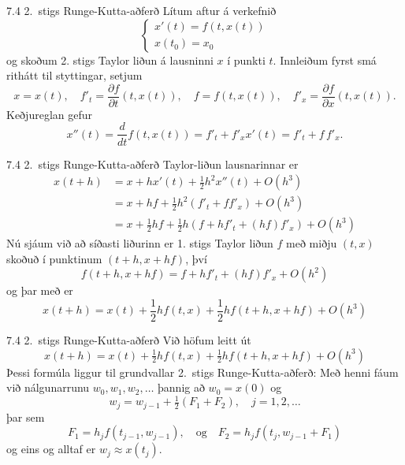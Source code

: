 \begin{frame}{7.4 2.~stigs Runge-Kutta-aðferð} 
Lítum aftur á verkefnið
\begin{equation*}
  \left\{
    \begin{array}{l}
      x'(t) = f(t,x(t)) \\
      x(t_0) = x_0
    \end{array}
  \right.
\end{equation*}
og skoðum 2. stigs Taylor liðun á lausninni $x$ í punkti
$t$. Innleiðum fyrst smá rithátt til styttingar, setjum 
\begin{equation*}
  x = x(t), \quad f'_t = \frac{\partial f}{\partial t}(t,x(t)), \quad
  f = f(t,x(t)), \quad f'_x = \frac{\partial f}{\partial x}(t,x(t)).
\end{equation*}
Keðjureglan gefur
$$
x''(t)=\dfrac d{dt}f(t,x(t))=f'_t+f'_xx'(t)=f'_t+f\,f'_x.
$$
\end{frame}


\begin{frame}{7.4 2.~stigs Runge-Kutta-aðferð} 
Taylor-liðun lausnarinnar er 
\begin{align*}
  x(t+h) &= x + hx'(t) + \frac{1}{2} h^2 x''(t) + O(h^3) \\
  &= x + hf + \frac{1}{2} h^2 ( f'_t + f f'_x ) + O(h^3) \\
  &= x + \frac{1}{2}hf + \frac{1}{2}h( f + hf'_t + (hf)f'_x) + O(h^3)
\end{align*}
Nú sjáum við að síðasti liðurinn er 1. stigs Taylor 
liðun $f$ með miðju $(t,x)$ skoðuð í punktinum $(t+h,x+hf)$, því
\begin{equation*}
  f(t+h,x + hf) = f + hf'_t + (hf) f'_x + O(h^2)
\end{equation*}
og þar með er
\begin{equation*}
  x(t+h) = x(t) + \frac{1}{2} hf(t,x) + \frac{1}{2} hf(t+h,x+hf) + O(h^3)
\end{equation*}
\end{frame}


\begin{frame}{7.4 2.~stigs Runge-Kutta-aðferð} 
Við höfum leitt út
\begin{equation*}
  x(t+h) = x(t) + \tfrac{1}{2} hf(t,x) + \tfrac{1}{2} hf(t+h,x+hf) + O(h^3)
\end{equation*}
Þessi formúla liggur til grundvallar 
2.~stigs Runge-Kutta-aðferð:
Með henni fáum við nálgunarrunu $w_0, w_1, w_2, \ldots$ þannig að
$w_0=x(0)$ og 
\begin{equation*}
  w_j = w_{j-1} + \tfrac{1}{2}(F_1 + F_2), \quad j = 1,2,\ldots
\end{equation*}
þar sem
\begin{equation*}
  F_1 = h_jf(t_{j-1},w_{j-1}),
  \quad \text{og} \quad
  F_2 = h_jf(t_j,w_{j-1}+F_1)
\end{equation*}
og eins og alltaf er $w_j \approx x(t_j)$.
\end{frame}


